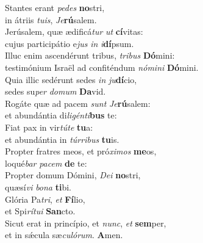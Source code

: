 \evenverse Stantes erant \textit{pe}\textit{des} \textbf{no}stri,~\*\\
\evenverse in átriis \textit{tu}\textit{is}, \textit{Je}\textbf{rú}salem.\\
\oddverse Jerúsalem, quæ ædificá\textit{tur} \textit{ut} \textbf{cí}vitas:~\*\\
\oddverse cujus participátio e\textit{jus} \textit{in} \textit{i}\textbf{dí}psum.\\
\evenverse Illuc enim ascendérunt tribus, \textit{tri}\textit{bus} \textbf{Dó}mini:~\*\\
\evenverse testimónium Israël ad confiténdum \textit{nó}\textit{mi}\textit{ni} \textbf{Dó}mini.\\
\oddverse Quia illic sedérunt sedes \textit{in} \textit{ju}\textbf{dí}cio,~\*\\
\oddverse sedes su\textit{per} \textit{do}\textit{mum} \textbf{Da}vid.\\
\evenverse Rogáte quæ ad pacem \textit{sunt} \textit{Je}\textbf{rú}salem:~\*\\
\evenverse et abundántia di\textit{li}\textit{gén}\textit{ti}\textbf{bus} te:\\
\oddverse Fiat pax in vir\textit{tú}\textit{te} \textbf{tu}a:~\*\\
\oddverse et abundántia in \textit{túr}\textit{ri}\textit{bus} \textbf{tu}is.\\
\evenverse Propter fratres meos, et pró\textit{xi}\textit{mos} \textbf{me}os,~\*\\
\evenverse loqué\textit{bar} \textit{pa}\textit{cem} \textbf{de} te:\\
\oddverse Propter domum Dómini, \textit{De}\textit{i} \textbf{no}stri,~\*\\
\oddverse quæsí\textit{vi} \textit{bo}\textit{na} \textbf{ti}bi.\\
\evenverse Glória Pa\textit{tri}, \textit{et} \textbf{Fí}lio,~\*\\
\evenverse et Spi\textit{rí}\textit{tu}\textit{i} \textbf{San}cto.\\
\oddverse Sicut erat in princípio, et \textit{nunc}, \textit{et} \textbf{sem}per,~\*\\
\oddverse et in sǽcula sæ\textit{cu}\textit{ló}\textit{rum}. \textbf{A}men.\\

